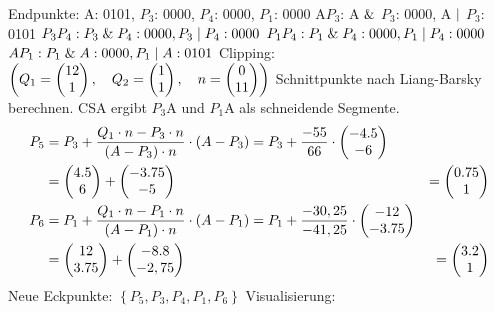 \documentclass[a4paper,10pt,DIV=14]{article}
\begin{document}
Endpunkte: A: 0101, $P_3$: 0000, $P_4$: 0000, $P_1$: 0000 \newline
A$P_3$: A $\mathrel{\&}$ $P_3$: 0000, A $\mathrel{|}$ $P_3$: 0101 \newline
$P_3P_4: P_3 \mathrel{\&} P_4: 0000, P_3 \mathrel{|} P_4: 0000$ \newline
$P_1P_4: P_1 \mathrel{\&} P_4: 0000, P_1 \mathrel{|} P_4: 0000$ \newline
$AP_1: P_1 \mathrel{\&} A: 0000, P_1 \mathrel{|} A: 0101$ \newline
Clipping: $\left(Q_1= \begin{pmatrix} 12 \\ 1 \end{pmatrix}, \quad Q_2= \begin{pmatrix} 1 \\ 1 \end{pmatrix}, \quad n = \begin{pmatrix} 0 \\ 11 \end{pmatrix} \right)$\newline
Schnittpunkte nach Liang-Barsky berechnen. CSA ergibt $P_3$A und $P_1$A als schneidende Segmente.\newline
\begin{align*}
P_5 &= P_3 + \frac{Q_1 \cdot n - P_3 \cdot n}{\left(A-P_3\right) \cdot n} \cdot \left(A-P_3\right) = P_3 + \frac{-55}{66} \cdot \begin{pmatrix} -4.5 \\ -6 \end{pmatrix} \\ 
&= \begin{pmatrix} 4.5 \\ 6 \end{pmatrix} + \begin{pmatrix} -3.75 \\ -5 \end{pmatrix} &= \begin{pmatrix} 0.75 \\ 1 \end{pmatrix}
\\
P_6 &= P_1 + \frac{Q_1 \cdot n - P_1 \cdot n}{\left(A-P_1\right) \cdot n} \cdot \left(A-P_1\right) = P_1 + \frac{-30,25}{-41,25} \cdot \begin{pmatrix} -12 \\ -3.75 \end{pmatrix} \\ &= \begin{pmatrix} 12 \\ 3.75 \end{pmatrix} + \begin{pmatrix} -8.8 \\ -2,75 \end{pmatrix} &= \begin{pmatrix} 3.2 \\ 1 \end{pmatrix}
\end{align*}
Neue Eckpunkte: $\left\lbrace P_5, P_3, P_4, P_1, P_6  \right\rbrace $\newline
Visualisierung: \newline
\begin{center}
\end{center}
\end{document}
